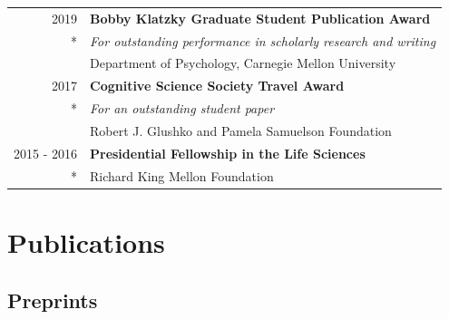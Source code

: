 \documentclass[letterpaper]{article}
\begin{document}
\begin{longtable}{rl}
              2019        & \textbf{Bobby Klatzky Graduate Student Publication Award}                                                        \\*
              & {\it For outstanding performance in scholarly research and writing}                                              \\
              & Department of Psychology, Carnegie Mellon University                                                             \\[6pt]
              2017        & \textbf{Cognitive Science Society Travel Award}                                                                  \\*
              & {\it For an outstanding student paper}                                                                            \\
              & Robert J. Glushko and Pamela Samuelson Foundation                                                                \\[6pt]
              2015 - 2016 & \textbf{Presidential Fellowship in the Life Sciences}                                                            \\*
              & Richard King Mellon Foundation                                                                                   \\
\end{longtable}

\section*{Publications} 

\subsection*{Preprints}
\end{document}
